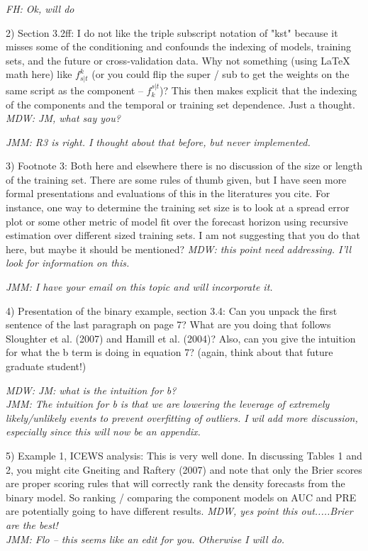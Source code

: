 \documentclass[10pt]{article}
\begin{document}
{\it FH: Ok, will do}

2) Section 3.2ff: I do not like the triple subscript notation of "kst" because it misses some of the conditioning and confounds the indexing of models, training sets, and the future or cross-validation data.  Why not something (using LaTeX math here) like $f^k_{s|t}$ (or you could flip the super / sub to get the weights on the same script as the component -- $f_k^{s|t}$)?  This then makes explicit that the indexing of the components and the temporal or training set dependence.  Just a thought. {\it MDW: JM, what say you?}

\textit{JMM: R3 is right.  I thought about that before, but never implemented.}

3) Footnote 3: Both here and elsewhere there is no discussion of the size or length of the training set.  There are some rules of thumb given, but I have seen more formal presentations and evaluations of this in the literatures you cite.  For instance, one way to determine the training set size is to look at a spread error plot or some other metric of model fit over the forecast horizon using recursive estimation over different sized training sets.  I am not suggesting that you do that here, but maybe it should be mentioned?
{\it MDW: this point need addressing. I'll look for information on this.}

\textit{JMM: I have your email on this topic and will incorporate it.}

4) Presentation of the binary example, section 3.4: Can you unpack the first sentence of the last paragraph on page 7?  What are you doing that follows Sloughter et al. (2007) and Hamill et al. (2004)?  Also, can you give the intuition for what the b term is doing in equation 7?  (again, think about that future graduate student!)

{\it MDW: JM: what is the intuition for b?}\\
{\it JMM: The intuition for b is that we are lowering the leverage of extremely likely/unlikely events to prevent overfitting of outliers.  I wil add more discussion, especially since this will now be an appendix.}

5) Example 1, ICEWS analysis: This is very well done.  In discussing Tables 1 and 2, you might cite Gneiting and Raftery (2007) and note that only the Brier scores are proper scoring rules that will correctly rank the density forecasts from the binary model.  So ranking / comparing the component models on AUC and PRE are potentially going to have different results.
{\it MDW, yes point this out.....Brier are the best!}\\
{\it JMM: Flo -- this seems like an edit for you.   Otherwise I will do.}
\end{document}

